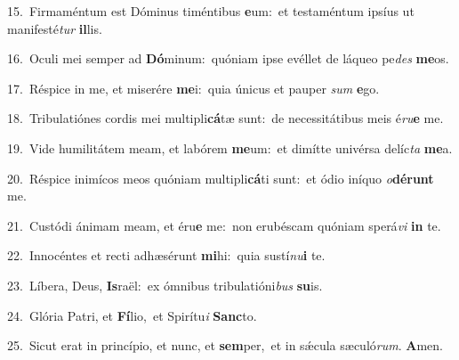 {\numbfont\textcolor{\numbcolor}{15.}}~Firmaméntum est Dóminus timéntibus \textbf{e}\-um:~\star et testaméntum ipsíus ut manifesté\textit{tur} \textbf{il}\-lis.\par
{\numbfont\textcolor{\numbcolor}{16.}}~Oculi mei semper ad \textbf{Dó}\-minum:~\star quóniam ipse evéllet de láqueo pe\textit{des} \textbf{me}\-os.\par
{\numbfont\textcolor{\numbcolor}{17.}}~Réspice in me, et miserére \textbf{me}\-i:~\star quia únicus et pauper \textit{sum} \textbf{e}\-go.\par
{\numbfont\textcolor{\numbcolor}{18.}}~Tribulatiónes cordis mei multipli\-\textbf{cá}\-tæ sunt:~\star de necessitátibus meis é\-\textit{ru}\-\textbf{e} me.\par
{\numbfont\textcolor{\numbcolor}{19.}}~Vide humilitátem meam, et labórem \textbf{me}\-um:~\star et dimítte univérsa delíc\textit{ta} \textbf{me}\-a.\par
{\numbfont\textcolor{\numbcolor}{20.}}~Réspice inimícos meos quóniam multipli\-\textbf{cá}\-ti sunt:~\star et ódio iníquo \textit{o}\-\textbf{dé}\textbf{runt} me.\par
{\numbfont\textcolor{\numbcolor}{21.}}~Custódi ánimam meam, et éru\textbf{e} me:~\star non erubéscam quóniam sperá\textit{vi} \textbf{in} te.\par
{\numbfont\textcolor{\numbcolor}{22.}}~Innocéntes et recti adhæsérunt \textbf{mi}\-hi:~\star quia sustí\-\textit{nu}\-\textbf{i} te.\par
{\numbfont\textcolor{\numbcolor}{23.}}~Líbera, Deus, \textbf{Is}\-raël:~\star ex ómnibus tribulatióni\textit{bus} \textbf{su}\-is.\par
{\numbfont\textcolor{\numbcolor}{24.}}~Glória Patri, et \textbf{Fí}\-lio,~\star et Spirítu\textit{i} \textbf{Sanc}\-to.\par
{\numbfont\textcolor{\numbcolor}{25.}}~Sicut erat in princípio, et nunc, et \textbf{sem}\-per,~\star et in sǽcula sæculó\-\textit{rum}\-. \textbf{A}\-men.\par
